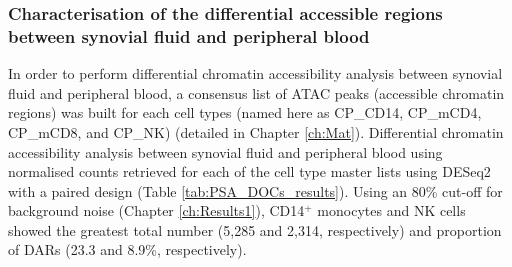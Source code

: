 


\subsubsection{Characterisation of the differential accessible regions between synovial fluid and peripheral blood}

In order to perform differential chromatin accessibility analysis between synovial fluid and peripheral blood, a consensus list of ATAC peaks (accessible chromatin regions) was built for each cell types (named here as CP\_CD14, CP\_mCD4, CP\_mCD8, and CP\_NK) (detailed in Chapter \ref{ch:Mat}). %
Differential chromatin accessibility analysis between synovial fluid and peripheral blood using normalised counts retrieved for each of the cell type master lists using DESeq2 with a paired design (Table \ref{tab:PSA_DOCs_results}). Using an 80\% cut-off for background noise (Chapter \ref{ch:Results1}), %
CD14$^+$ monocytes and NK cells showed the greatest total number (5,285 and 2,314, respectively) and proportion of DARs (23.3 and 8.9\%, respectively). 


